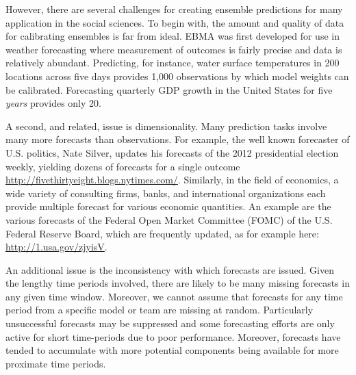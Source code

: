 \documentclass[12pt,fullpage,endnotes]{article}
\begin{document}
However, there are several challenges for creating ensemble
predictions for many application in the social sciences.  To begin
with, the amount and quality of data for calibrating ensembles is far
from ideal.  EBMA was first developed for use in weather forecasting
where measurement of outcomes is fairly precise and data is relatively
abundant.  Predicting, for instance, water surface temperatures in 200
locations across five days provides 1,000 observations by which model
weights can be calibrated.  Forecasting quarterly GDP growth in the
United States for five \textit{years} provides only 20.

A second, and related, issue is dimensionality. Many prediction tasks
involve many more forecasts than observations.  For example, the well
known forecaster of U.S. politics, Nate Silver, updates his forecasts
of the 2012 presidential election weekly, yielding dozens of forecasts
for a single outcome \url{http://fivethirtyeight.blogs.nytimes.com/}.
Similarly, in the field of economics, a wide variety of consulting
firms, banks, and international organizations each provide multiple
forecast for various economic quantities. An example are the various
forecasts of the Federal Open Market Committee (FOMC) of the
U.S. Federal Reserve Board, which are frequently updated, as for
example here: \url{http://1.usa.gov/zjyisV}.

An additional issue is the inconsistency with which forecasts are
issued. Given the lengthy time periods involved, there are likely to
be many missing forecasts in any given time window.  Moreover, we
cannot assume that forecasts for any time period from a specific model
or team are missing at random.  Particularly unsuccessful forecasts
may be suppressed and some forecasting efforts are only active for
short time-periods due to poor performance.  Moreover, forecasts have
tended to accumulate with more potential components being available
for more proximate time periods. 
\end{document}
